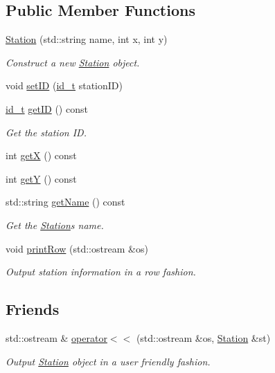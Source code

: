 \subsection*{Public Member Functions}
\begin{DoxyCompactItemize}
\item 
\mbox{\hyperlink{classStation_ae136c6cba0e6f4d3a33d0b6e6d0082de}{Station}} (std\+::string name, int x, int y)
\begin{DoxyCompactList}\small\item\em Construct a new \mbox{\hyperlink{classStation}{Station}} object. \end{DoxyCompactList}\item 
void \mbox{\hyperlink{classStation_a1cb215c1fea787806cfd116c7c32d350}{set\+ID}} (\mbox{\hyperlink{project__utils_8h_a8f3a969054ad2200720b96e7e23dd4e1}{id\+\_\+t}} station\+ID)
\item 
\mbox{\hyperlink{project__utils_8h_a8f3a969054ad2200720b96e7e23dd4e1}{id\+\_\+t}} \mbox{\hyperlink{classStation_acbc5832d77cbe29c9006212b9cc32a42}{get\+ID}} () const
\begin{DoxyCompactList}\small\item\em Get the station ID. \end{DoxyCompactList}\item 
int \mbox{\hyperlink{classStation_a2205a1288789260beee59fd3532286e9}{getX}} () const
\item 
int \mbox{\hyperlink{classStation_a28c75f35db1f6a1d3ed0488f2effbfb4}{getY}} () const
\item 
std\+::string \mbox{\hyperlink{classStation_ac823ae175ec0e2baff462ed9612c7bae}{get\+Name}} () const
\begin{DoxyCompactList}\small\item\em Get the \mbox{\hyperlink{classStation}{Station}}\textquotesingle{}s name. \end{DoxyCompactList}\item 
void \mbox{\hyperlink{classStation_a66c028cdffd79bddd0704235b051ff4e}{print\+Row}} (std\+::ostream \&os)
\begin{DoxyCompactList}\small\item\em Output station information in a row fashion. \end{DoxyCompactList}\end{DoxyCompactItemize}
\subsection*{Friends}
\begin{DoxyCompactItemize}
\item 
std\+::ostream \& \mbox{\hyperlink{classStation_ae5ca3266f8eead5634eb5926438392da}{operator$<$$<$}} (std\+::ostream \&os, \mbox{\hyperlink{classStation}{Station}} \&st)
\begin{DoxyCompactList}\small\item\em Output \mbox{\hyperlink{classStation}{Station}} object in a user friendly fashion. \end{DoxyCompactList}\end{DoxyCompactItemize}


